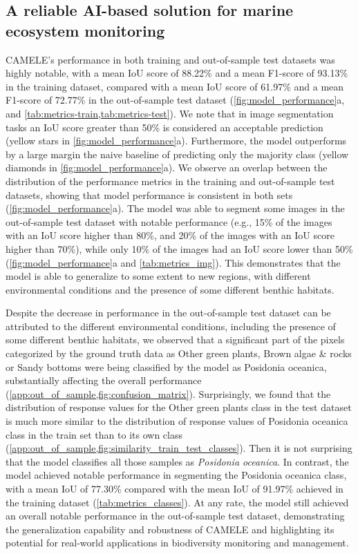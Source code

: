 \subsection{A reliable AI-based solution for marine ecosystem monitoring}

CAMELE's performance in both training and out-of-sample test datasets was
highly notable, with a mean IoU score of 88.22\% and a mean F1-score of
93.13\% in the training dataset, compared with a mean IoU score of 61.97\%
and a mean F1-score of 72.77\% in the out-of-sample test dataset
(\cref{fig:model_performance}a, and \cref{tab:metrics-train,tab:metrics-test}).
We note that in image segmentation tasks an IoU score greater than 50\% is
considered an acceptable prediction \cite{dai2016instance} (yellow stars in
\cref{fig:model_performance}a).
Furthermore, the model outperforms by a large margin
the naive baseline of predicting only the majority class (yellow diamonds in
\cref{fig:model_performance}a). We observe an overlap between the
distribution of the performance metrics in the training and out-of-sample test
datasets, showing that model performance is consistent in both sets
(\cref{fig:model_performance}a). The model was able to segment some images in
the out-of-sample test dataset with notable performance (e.g., 15\% of the
images with an IoU score higher than 80\%, and 20\% of the images with an IoU
score higher than 70\%), while only 10\% of the images had an IoU score lower
than 50\% (\cref{fig:model_performance}a and \cref{tab:metrics_img}). This
demonstrates that the model is able to generalize to some extent to new
regions, with different environmental conditions and the presence of some
different benthic habitats.

Despite the decrease in performance in the out-of-sample test dataset can be
attributed to the different environmental conditions, including the presence of
some different benthic habitats, we observed that a significant part
of the pixels categorized by the ground truth data as Other green
plants, Brown algae \& rocks or Sandy bottoms were being classified by the
model as Posidonia oceanica, substantially affecting the overall
performance (\cref{app:out_of_sample,fig:confusion_matrix}).
Surprisingly, we found that the distribution of response values for the Other
green plants class in the test dataset is much more similar to the distribution
of response values of Posidonia oceanica class in the train set
than to its own class
(\cref{app:out_of_sample,fig:similarity_train_test_classes}). Then it is not
surprising that the
model classifies all those samples as \textit{Posidonia oceanica}. In contrast,
the model achieved notable performance in segmenting the Posidonia
oceanica class, with a mean IoU of 77.30\% compared with the mean IoU of
91.97\% achieved in the training dataset (\cref{tab:metrics_classes}). At
any
rate, the model still achieved an overall notable performance in the
out-of-sample test dataset, demonstrating the generalization capability and
robustness of CAMELE and highlighting its potential for real-world applications
in biodiversity monitoring and management.

